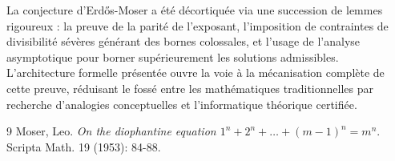 \documentclass[11pt,a4paper,french]{article}
\theoremstyle{definition}
\theoremstyle{remark}
\begin{document}
La conjecture d'Erdős-Moser a été décortiquée via une succession de lemmes rigoureux : la preuve de la parité de l'exposant, l'imposition de contraintes de divisibilité sévères générant des bornes colossales, et l'usage de l'analyse asymptotique pour borner supérieurement les solutions admissibles. L'architecture formelle présentée ouvre la voie à la mécanisation complète de cette preuve, réduisant le fossé entre les mathématiques traditionnelles par recherche d'analogies conceptuelles et l'informatique théorique certifiée.

\begin{thebibliography}{9}
Moser, Leo. \textit{On the diophantine equation $1^n + 2^n + \dots + (m-1)^n = m^n$}. Scripta Math. 19 (1953): 84-88.
\end{thebibliography}
\end{document}
